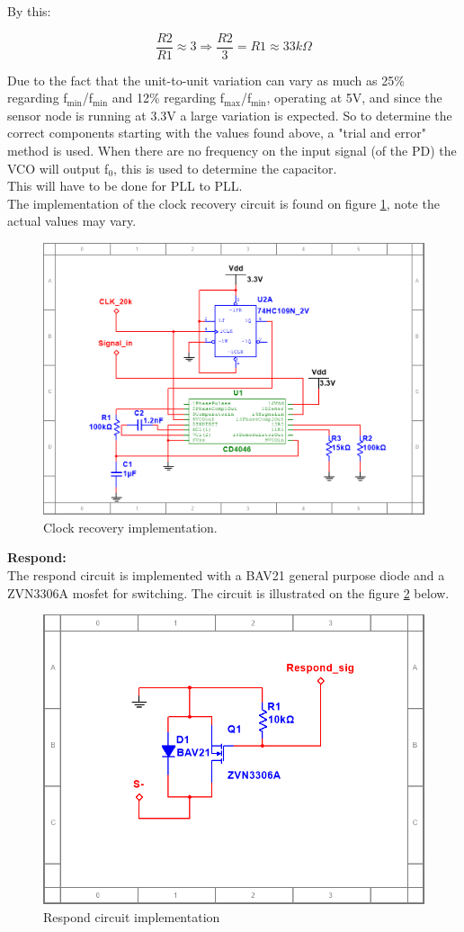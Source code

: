 By this:

\begin{equation}
	\frac{R2}{R1}\approx3 \Rightarrow \frac{R2}{3}=R1\approx33k\Omega
\end{equation}

Due to the fact that the unit-to-unit variation can vary as much as 25\% regarding f$_{\text{min}}$/f$_{\text{min}}$ and 12\% regarding f$_{\text{max}}$/f$_{\text{min}}$, operating at 5V, and since the sensor node is running at 3.3V a large variation is expected.
So to determine the correct components starting with the values found above, a "trial and error" method is used. When there are no frequency on the input signal (of the PD) the VCO will output f$_{\text{0}}$, this is used to determine the capacitor.\\
This will have to be done for PLL to PLL.\\

The implementation of the clock recovery circuit is found on figure \ref{fig:clock_recovery}, note the actual values may vary.

\begin{figure}[H]
	\centering
	\includegraphics[width=.7\textwidth]{billeder/clock_recovery_imp}
	\caption{Clock recovery implementation.}
	\label{fig:clock_recovery}
\end{figure}


\textbf{Respond:}\\
The respond circuit is implemented with a BAV21 general purpose diode and a ZVN3306A mosfet for switching. The circuit is illustrated on the figure \ref{fig:respond_Circ} below.

\begin{figure}[H]
	\centering
	\includegraphics[width=.5\textwidth]{billeder/respond_imp}
	\caption{Respond circuit implementation}
	\label{fig:respond_Circ}
\end{figure} 

